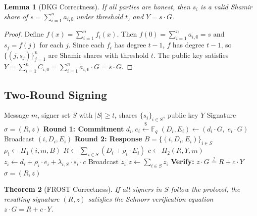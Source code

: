 \documentclass[11pt,twocolumn]{article}
\newtheorem{theorem}{Theorem}[section]
\newtheorem{lemma}[theorem]{Lemma}
\begin{document}
\begin{lemma}[DKG Correctness]
\label{lem:dkg-correct}
If all parties are honest, then $s_i$ is a valid Shamir share of
$s = \sum_{i=1}^n a_{i,0}$ under threshold $t$, and $Y = s \cdot G$.
\end{lemma}

\begin{proof}
Define $f(x) = \sum_{i=1}^n f_i(x)$. Then $f(0) = \sum_{i=1}^n a_{i,0} = s$ and
$s_j = f(j)$ for each $j$. Since each $f_i$ has degree $t-1$, $f$ has degree $t-1$,
so $\{(j, s_j)\}_{j=1}^n$ are Shamir shares with threshold $t$. The public key
satisfies $Y = \sum_{i=1}^n C_{i,0} = \sum_{i=1}^n a_{i,0} \cdot G = s \cdot G$.
\end{proof}

\subsection{Two-Round Signing}

\begin{algorithm}[H]
\caption{FROST Threshold Signing}
\label{alg:frost-sign}
\begin{algorithmic}[1]
\Require Message $m$, signer set $S$ with $|S| \geq t$, shares $\{s_i\}_{i \in S}$, public key $Y$
\Ensure Signature $\sigma = (R, z)$
\Statex \textbf{Round 1: Commitment}
  \State $d_i, e_i \xleftarrow{\$} \mathbb{F}_q$
  \State $(D_i, E_i) \gets (d_i \cdot G, \; e_i \cdot G)$
  \State Broadcast $(i, D_i, E_i)$
\EndFor
\Statex \textbf{Round 2: Response}
\State $B = \{(i, D_i, E_i)\}_{i \in S}$ 
  \State $\rho_i \gets H_1(i, m, B)$ 
\EndFor
\State $R \gets \sum_{i \in S} (D_i + \rho_i \cdot E_i)$
\State $c \gets H_2(R, Y, m)$ 
  \State $z_i \gets d_i + \rho_i \cdot e_i + \lambda_{i,S} \cdot s_i \cdot c$
  \State Broadcast $z_i$
\EndFor
\State $z \gets \sum_{i \in S} z_i$
\State \textbf{Verify:} $z \cdot G \stackrel{?}{=} R + c \cdot Y$
\State \Return $\sigma = (R, z)$
\end{algorithmic}
\end{algorithm}

\begin{theorem}[FROST Correctness]
\label{thm:frost-correct}
If all signers in $S$ follow the protocol, the resulting signature $(R, z)$ satisfies
the Schnorr verification equation $z \cdot G = R + c \cdot Y$.
\end{theorem}
\end{document}

